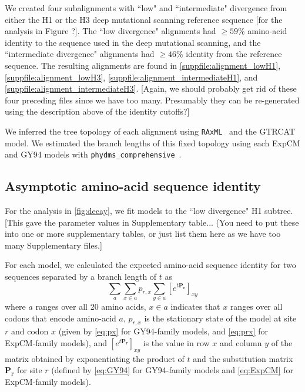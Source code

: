 \documentclass[11pt]{article}
\newcommand\jdbcomment[1]{{\color{red}[#1]}}
\begin{document}
We created four subalignments with ``low" and ``intermediate" divergence from either the H1 or the H3 deep mutational scanning reference sequence \jdbcomment{for the analysis in Figure ?}. 
The ``low divergence" alignments had $\ge 59\%$ amino-acid identity to the sequence used in the deep mutational scanning, and the ``intermediate divergence" alignments had $\ge 46\%$ identity from the reference sequence.
The resulting alignments are found in \ref{suppfile:alignment_lowH1}, \ref{suppfile:alignment_lowH3}, \ref{suppfile:alignment_intermediateH1}, and \ref{suppfile:alignment_intermediateH3}.  
\jdbcomment{Again, we should probably get rid of these four preceding files since we have too many. Presumably they can be re-generated using the description above of the identity cutoffs?}

We inferred the tree topology of each alignment using \texttt{RAxML}~\citep{stamatakis2006raxml} and the GTRCAT model. 
We estimated the branch lengths of this fixed topology using each ExpCM and GY94 models with \texttt{phydms\_comprehensive}~\citep{hilton2017phydms}. 

\subsection*{Asymptotic amino-acid sequence identity}
For the analysis in \ref{fig:decay}, we fit models to the ``low divergence" H1 subtree.
\jdbcomment{This gave the parameter values in Supplementary table... (You need to put these into one or more supplementary tables, or just list them here as we have too many Supplementary files.} 

For each model, we calculated the expected amino-acid sequence identity for two sequences separated by a branch length of $t$ as 
\begin{equation}
\label{eq:f}
\sum_a \sum_{x \in a} p_{r,x} \sum_{y \in a} \left[e^{t\mathbf{P_r}}\right]_{xy}
\end{equation}
where $a$ ranges over all 20 amino acids, $x \in a$ indicates that $x$ ranges over all codons that encode amino-acid $a$, $p_{r,x}$ is the stationary state of the model at site $r$ and codon $x$ (given by \ref{eq:px} for GY94-family models, and \ref{eq:prx} for ExpCM-family models), and $\left[e^{t\mathbf{P_r}}\right]_{xy}$ is the value in row $x$ and column $y$ of the matrix obtained by exponentiating the product of $t$ and the substitution matrix $\mathbf{P_r}$ for site $r$ (defined by \ref{eq:GY94} for GY94-family models and \ref{eq:ExpCM} for ExpCM-family models).
\end{document}
